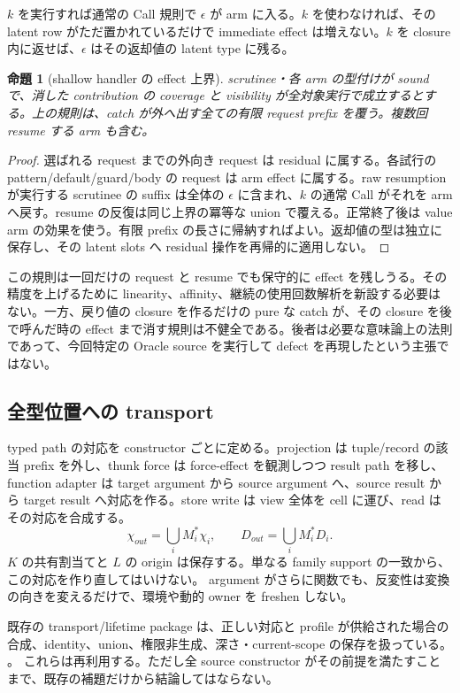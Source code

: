 \documentclass[11pt,a4paper]{article}
\newtheorem{theorem}{命題}[section]
\theoremstyle{remark}
\newcommand{\newsrc}[2]{\href{https://github.com/momota1029/yulang/blob/d5552b3e328e53c3a60170329cd2192e4e11c097/#1}{\texttt{\detokenize{#2}}}}
\begin{document}
$k$ を実行すれば通常の Call 規則で $\epsilon$ が arm に入る。$k$ を使わなければ、その latent row がただ置かれているだけで immediate effect は増えない。$k$ を closure 内に返せば、$\epsilon$ はその返却値の latent type に残る。

\begin{theorem}[shallow handler の effect 上界]
scrutinee・各 arm の型付けが sound で、消した contribution の coverage と visibility が全対象実行で成立するとする。上の規則は、catch が外へ出す全ての有限 request prefix を覆う。複数回 resume する arm も含む。
\end{theorem}
\begin{proof}
選ばれる request までの外向き request は residual に属する。各試行の pattern/default/guard/body の request は arm effect に属する。raw resumption が実行する scrutinee の suffix は全体の $\epsilon$ に含まれ、$k$ の通常 Call がそれを arm へ戻す。resume の反復は同じ上界の冪等な union で覆える。正常終了後は value arm の効果を使う。有限 prefix の長さに帰納すればよい。返却値の型は独立に保存し、その latent slots へ residual 操作を再帰的に適用しない。
\end{proof}

この規則は一回だけの request と resume でも保守的に effect を残しうる。その精度を上げるために linearity、affinity、継続の使用回数解析を新設する必要はない。一方、戻り値の closure を作るだけの pure な catch が、その closure を後で呼んだ時の effect まで消す規則は不健全である。後者は必要な意味論上の法則であって、今回特定の Oracle source を実行して defect を再現したという主張ではない。

\subsection{全型位置への transport}

typed path の対応を constructor ごとに定める。projection は tuple/record の該当 prefix を外し、thunk force は force-effect を観測しつつ result path を移し、function adapter は target argument から source argument へ、source result から target result へ対応を作る。store write は view 全体を cell に運び、read はその対応を合成する。
\[
\chi_{out}=\bigcup_i M_i^*\chi_i,\qquad
D_{out}=\bigcup_i M_i^*D_i.
\]
$K$ の共有割当てと $L$ の origin は保存する。単なる family support の一致から、この対応を作り直してはいけない。
argument がさらに関数でも、反変性は変換の向きを変えるだけで、環境や動的 owner を freshen しない。

既存の transport/lifetime package は、正しい対応と profile が供給された場合の合成、identity、union、権限非生成、深さ・current-scope の保存を扱っている。
\newsrc{notes/design/2026-10-02-typed-boundary-realization-draft.md\#L870-L968}{transport and lifetime lemmas}。
これらは再利用する。ただし全 source constructor がその前提を満たすことまで、既存の補題だけから結論してはならない。
\end{document}
